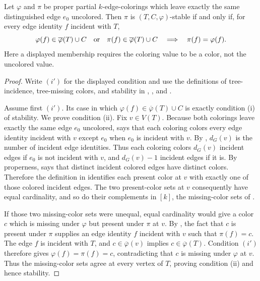 \begin{lemma}
Let $\varphi$ and $\pi$ be proper partial $k$-edge-colorings which leave
exactly the same distinguished edge $e_0$ uncolored.  Then $\pi$ is
$(T,C,\varphi)$-stable if and only if, for every edge identity $f$ incident
with $T$,
\[
 \varphi(f)\in\overline\varphi(T)\cup C
 \quad\hbox{or}\quad
 \pi(f)\in\overline\varphi(T)\cup C
 \quad\Longrightarrow\quad
 \pi(f)=\varphi(f).
\]
Here a displayed membership requires the coloring value to be a color, not
the uncolored value.
\end{lemma}
\begin{proof}
Write $(i')$ for the displayed condition and use the definitions of
tree-incidence, tree-missing colors, and stability in
, , and
.

Assume first $(i')$.  Its case in which
$\varphi(f)\in\overline\varphi(T)\cup C$ is exactly condition (i) of
stability.  We prove condition (ii).  Fix $v\in V(T)$.  Because both
colorings leave exactly the same edge $e_0$ uncolored,
 says that each coloring colors every edge
identity incident with $v$ except $e_0$ when $e_0$ is incident with $v$.
By , $d_G(v)$ is the number of incident edge identities.
Thus each coloring colors $d_G(v)$ incident edges if $e_0$ is not incident
with $v$, and $d_G(v)-1$ incident edges if it is.  By properness,
 says that distinct incident colored edges
have distinct colors.  Therefore the definition in 
identifies each present color at $v$ with exactly one of those colored
incident edges.  The two present-color sets at $v$ consequently have equal
cardinality, and so do their complements in $[k]$, the missing-color sets
of .

If those two missing-color sets were unequal, equal cardinality would give
a color $c$ which is missing under $\varphi$ but present under $\pi$ at
$v$.  By , the fact that $c$ is present under
$\pi$ supplies an edge identity $f$ incident with $v$ such that
$\pi(f)=c$.  The edge $f$ is incident with $T$, and
$c\in\overline\varphi(v)$ implies
$c\in\overline\varphi(T)$.  Condition $(i')$ therefore gives
$\varphi(f)=\pi(f)=c$, contradicting that $c$ is missing under $\varphi$
at $v$.  Thus the missing-color sets agree at every vertex of $T$, proving
condition (ii) and hence stability.


\end{proof}

